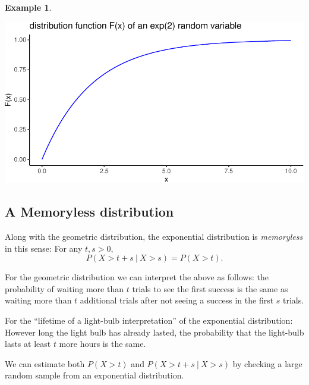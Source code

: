 \documentclass[
]{book}
\theoremstyle{definition}
\theoremstyle{definition}
\newtheorem{example}{Example}[chapter]
\theoremstyle{definition}
\theoremstyle{definition}
\theoremstyle{remark}
\begin{document}
\begin{example}
\begin{center}\includegraphics{math340-notes_files/figure-latex/unnamed-chunk-211-1} \end{center}

\end{example}

\subsection*{A Memoryless distribution}\label{a-memoryless-distribution}

Along with the geometric distribution, the exponential distribution is \emph{memoryless} in this sense: For any \(t,s>0,\) \[P(X > t + s~|~X > s) = P(X > t).\]

For the geometric distribution we can interpret the above as follows: the probability of waiting more than \(t\) trials to see the first success is the same as waiting more than \(t\) additional trials after not seeing a success in the first \(s\) trials.

For the ``lifetime of a light-bulb interpretation'' of the exponential distribution: However long the light bulb has already lasted, the probability that the light-bulb lasts at least \(t\) more hours is the same.

We can estimate both \(P(X>t)\) and \(P(X>t+s ~|~ X>s)\) by checking a large random sample from an exponential distribution.
\end{document}
